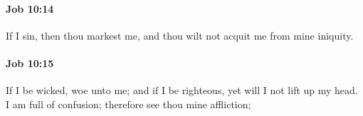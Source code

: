 		\paragraph{Job 10:14} %
			\label{JOB-10-14}

			If I sin, then thou markest me, and thou wilt not acquit me from mine iniquity.


		\paragraph{Job 10:15} %
			\label{JOB-10-15}

			If I be wicked, woe unto me; and if I be righteous, yet will I not lift up my head. I am full of confusion; therefore see thou mine affliction;


